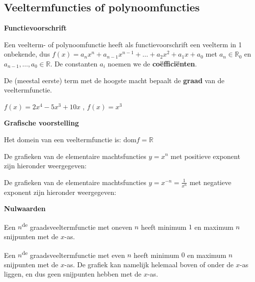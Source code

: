 \subsection{Veeltermfuncties of polynoomfuncties}
\label{sec:vtf}

\textbf{Functievoorschrift}

\begin{definitie}
	Een veelterm- of polynoomfunctie heeft als functievoorschrift een veelterm in 1 onbekende, dus
$f(x)=a_{n}x^{n}+a_{n-1}x^{n-1}+\ldots+a_{2}x^{2}+a_{1}x+a_{0}$
met $a_{n}\in\mathbb{R}_{0}$ en $a_{n-1},\ldots,a_{0}\in\mathbb{R}$. De constanten $a_{i}$ noemen we de \textbf{co\"effici\"enten}.

\end{definitie}

De (meestal eerste) term met de hoogste macht bepaalt de \textbf{graad} van de veeltermfunctie.

\begin{voorbeeld}
	$f(x)=2x^{4}-5x^{3}+10x$ , $f(x)=x^{3}$ 
\end{voorbeeld}

\textbf{Grafische voorstelling}

Het domein van een veeltermfunctie is: $\textrm{dom}f=\mathbb{R}$

De grafieken van de elementaire machtsfuncties $y=x^{n}$
met positieve exponent zijn hieronder weergegeven:


De grafieken van de elementaire machtsfuncties $y=x^{-n}=\frac{1}{x^{n}}$
met negatieve exponent zijn hieronder weergegeven:




\textbf{Nulwaarden}

 Een $n$\textsuperscript{de} graadsveeltermfunctie met oneven
$n$ heeft minimum $1$ en maximum $n$ snijpunten met de $x$-as.

 Een $n$\textsuperscript{de} graadsveeltermfunctie met even
$n$ heeft minimum $0$ en maximum $n$ snijpunten met de $x$-as. De grafiek
kan namelijk helemaal boven of onder de $x$-as liggen, en dus geen
snijpunten hebben met de $x$-as.




